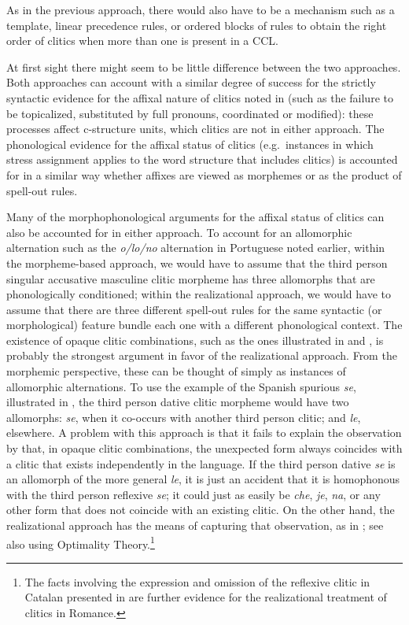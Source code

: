 \documentclass[output=paper,hidelinks]{langscibook}
\begin{document}
\ea\label{ex:Romance:7}
\z
As in the previous approach, there would also have to be a mechanism such as a template, linear precedence rules, or ordered blocks of rules to obtain the right order of clitics when more than one is present in a CCL.

At first sight there might seem to be little difference between the two approaches. Both approaches can account with a similar degree of success for the strictly syntactic evidence for the affixal nature of clitics noted in  (such as the failure to be topicalized, substituted by full pronouns, coordinated or modified): these processes affect c-structure units, which clitics are not in either approach. The phonological evidence for the affixal status of clitics (e.g.\ instances in which stress assignment applies to the word structure that includes clitics) is accounted for in a similar way whether affixes are viewed as morphemes or as the product of spell-out rules.

Many of the morphophonological arguments for the affixal status of clitics can also be accounted for in either approach. To account for an allomorphic alternation such as the \textit{o/lo/no} alternation in Portuguese noted earlier, within the morpheme-based approach, we would have to assume that the third person singular accusative masculine clitic morpheme has three allomorphs that are phonologically conditioned; within the realizational approach, we would have to assume that there are three different spell-out rules for the same syntactic (or morphological) feature bundle each one with a different phonological context. The existence of opaque clitic combinations, such as the ones illustrated in  and , is probably the strongest argument in favor of the realizational approach. From the morphemic perspective, these can be thought of simply as instances of allomorphic alternations. To use the example of the Spanish spurious \textit{se}, illustrated in , the third person dative clitic morpheme would have two allomorphs: \textit{se}, when it co-occurs with another third person clitic; and \textit{le}, elsewhere. A problem with this approach is that it fails to explain the observation by \citet{Bonet1995} that, in opaque clitic combinations, the unexpected form always coincides with a clitic that exists independently in the language. If the third person dative \textit{se} is an allomorph of the more general \textit{le}, it is just an accident that it is homophonous with the third person reflexive \textit{se}; it could just as easily be \textit{che}, \textit{je}, \textit{na}, or any other form that does not coincide with an existing clitic. On the other hand, the realizational approach has the means of capturing that observation, as in \citet{Bonet1995}; see also \citet{Grimshaw1997} using Optimality Theory.\footnote{The facts involving the expression and omission of the reflexive clitic in Catalan presented in \citet{Alsina2020} are further evidence for the realizational treatment of clitics in Romance.}
\end{document}
